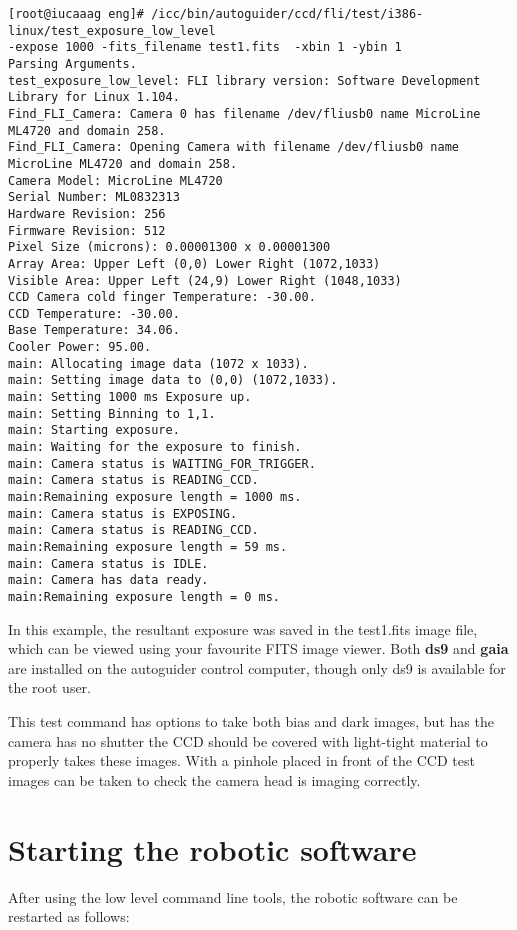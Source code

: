 \documentclass[10pt,a4paper]{article}
\begin{document}
\begin{verbatim}
[root@iucaaag eng]# /icc/bin/autoguider/ccd/fli/test/i386-linux/test_exposure_low_level 
-expose 1000 -fits_filename test1.fits  -xbin 1 -ybin 1
Parsing Arguments.
test_exposure_low_level: FLI library version: Software Development Library for Linux 1.104.
Find_FLI_Camera: Camera 0 has filename /dev/fliusb0 name MicroLine ML4720 and domain 258.
Find_FLI_Camera: Opening Camera with filename /dev/fliusb0 name MicroLine ML4720 and domain 258.
Camera Model: MicroLine ML4720
Serial Number: ML0832313
Hardware Revision: 256
Firmware Revision: 512
Pixel Size (microns): 0.00001300 x 0.00001300
Array Area: Upper Left (0,0) Lower Right (1072,1033)
Visible Area: Upper Left (24,9) Lower Right (1048,1033)
CCD Camera cold finger Temperature: -30.00.
CCD Temperature: -30.00.
Base Temperature: 34.06.
Cooler Power: 95.00.
main: Allocating image data (1072 x 1033).
main: Setting image data to (0,0) (1072,1033).
main: Setting 1000 ms Exposure up.
main: Setting Binning to 1,1.
main: Starting exposure.
main: Waiting for the exposure to finish.
main: Camera status is WAITING_FOR_TRIGGER.
main: Camera status is READING_CCD.
main:Remaining exposure length = 1000 ms.
main: Camera status is EXPOSING.
main: Camera status is READING_CCD.
main:Remaining exposure length = 59 ms.
main: Camera status is IDLE.
main: Camera has data ready.
main:Remaining exposure length = 0 ms.
\end{verbatim}

In this example, the resultant exposure was saved in the test1.fits image file, which can be viewed using your favourite FITS image viewer. Both {\bf ds9} and {\bf gaia} are installed on the autoguider control computer, though only ds9 is available for the root user.

This test command has options to take both bias and dark images, but has the camera has no shutter the CCD should be covered with light-tight material to properly takes these images. With a pinhole placed in front of the CCD test images can be taken to check the camera head is imaging correctly.

\section{Starting the robotic software}

After using the low level command line tools, the robotic software can be restarted as follows:
\end{document}
